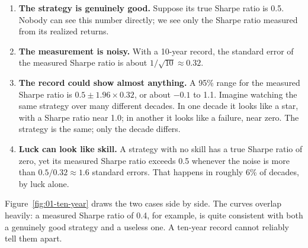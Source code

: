 \begin{enumerate}
  \item \textbf{The strategy is genuinely good.} Suppose its true Sharpe ratio is 0.5. Nobody can see this number directly; we see only the Sharpe ratio measured from its realized returns.
  \item \textbf{The measurement is noisy.} With a 10-year record, the standard error of the measured Sharpe ratio is about $1/\sqrt{10} \approx 0.32$.
  \item \textbf{The record could show almost anything.} A 95\% range for the measured Sharpe ratio is $0.5 \pm 1.96 \times 0.32$, or about $-0.1$ to 1.1. Imagine watching the same strategy over many different decades. In one decade it looks like a star, with a Sharpe ratio near 1.0; in another it looks like a failure, near zero. The strategy is the same; only the decade differs.
  \item \textbf{Luck can look like skill.} A strategy with no skill has a true Sharpe ratio of zero, yet its measured Sharpe ratio exceeds 0.5 whenever the noise is more than $0.5/0.32 \approx 1.6$ standard errors. That happens in roughly 6\% of decades, by luck alone.
\end{enumerate}

Figure~\ref{fig:01-ten-year} draws the two cases side by side. The curves overlap heavily: a measured Sharpe ratio of 0.4, for example, is quite consistent with both a genuinely good strategy and a useless one. A ten-year record cannot reliably tell them apart.


